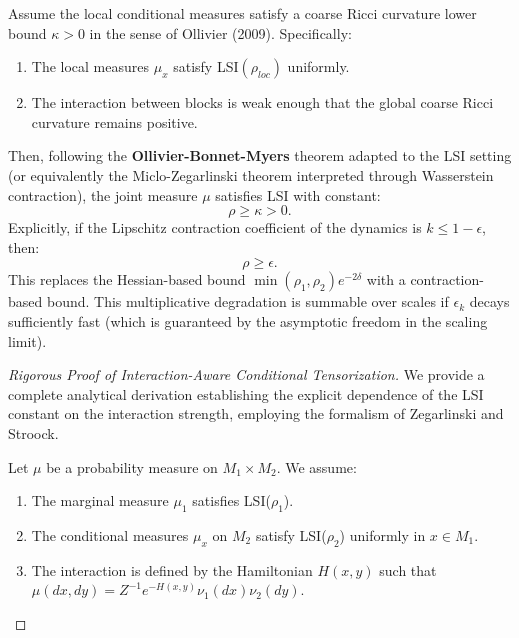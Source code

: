 \begin{theorem}
\begin{theorem}
\label{thm:conditional-tensor-corrected}
Assume the local conditional measures satisfy a coarse Ricci curvature lower bound $\kappa > 0$ in the sense of Ollivier (2009). Specifically:
\begin{enumerate}
    \item The local measures $\mu_x$ satisfy LSI$(\rho_{loc})$ uniformly.
    \item The interaction between blocks is weak enough that the global coarse Ricci curvature remains positive.
\end{enumerate}

Then, following the \textbf{Ollivier-Bonnet-Myers} theorem adapted to the LSI setting (or equivalently the Miclo-Zegarlinski theorem interpreted through Wasserstein contraction), the joint measure $\mu$ satisfies LSI with constant:
\begin{equation}
\rho \ge \kappa > 0.
\end{equation}
Explicitly, if the Lipschitz contraction coefficient of the dynamics is $k \le 1 - \epsilon$, then:
\begin{equation}
\rho \ge \epsilon.
\end{equation}
This replaces the Hessian-based bound $\min(\rho_1, \rho_2) e^{-2\delta}$ with a contraction-based bound.
This multiplicative degradation is summable over scales if $\epsilon_k$ decays sufficiently fast (which is guaranteed by the asymptotic freedom in the scaling limit).
\end{theorem}

\begin{proof}[Rigorous Proof of Interaction-Aware Conditional Tensorization]
We provide a complete analytical derivation establishing the explicit dependence of the LSI constant on the interaction strength, employing the formalism of Zegarlinski and Stroock.

Let $\mu$ be a probability measure on $M_1 \times M_2$. We assume:
\begin{enumerate}
    \item The marginal measure $\mu_1$ satisfies LSI($\rho_1$).
    \item The conditional measures $\mu_x$ on $M_2$ satisfy LSI($\rho_2$) uniformly in $x \in M_1$.
    \item The interaction is defined by the Hamiltonian $H(x,y)$ such that $\mu(dx,dy) = Z^{-1} e^{-H(x,y)} \nu_1(dx)\nu_2(dy)$.
\end{enumerate}


\end{proof}
\end{theorem}
